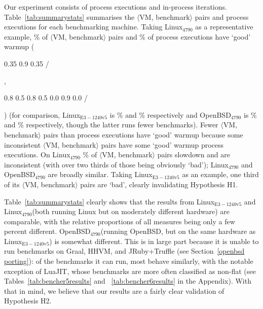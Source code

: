 \documentclass[acmlarge]{acmart}\settopmatter{printfolios=true}
\newcommand{\bencherfive}{Linux$_\mathrm{4790}$\xspace}
\newcommand{\benchersix}{OpenBSD$_\mathrm{4790}$\xspace}
\newcommand{\bencherseven}{Linux$_\mathrm{E3-1240v5}$\xspace}
\newcommand{\vmbpair}{$\langle$VM, benchmark$\rangle$\xspace}
\DeclareRobustCommand{\flatc}{%
\setlength{\sparklinethickness}{0.4pt}%
\begin{sparkline}{1.5}
\spark 0.1 0.35
       0.9 0.35
       /%
\end{sparkline}\xspace%
}
\DeclareRobustCommand{\warmup}{%
\setlength{\sparklinethickness}{0.4pt}%
\begin{sparkline}{1.5}
\spark 0.1 0.8
       0.5 0.8
       0.5 0.0
       0.9 0.0
       /%
\end{sparkline}\xspace%
}
\begin{document}
Our experiment consists of \totalpexecs{} process executions and \totaliterations{} in-process
iterations. Table~\ref{tab:summarystats} summarises the \vmbpair pairs
and process executions for each benchmarking machine. Taking \bencherfive
as a representative example,
%
\result\% of \vmbpair pairs and
%
\result\% of process executions have `good' warmup (\flatc, \warmup) (for comparison, \bencherseven
is
%
\result\% and
%
\result\% respectively and \benchersix is
%
\result\% and
%
\result\% respectively, though the latter runs fewer benchmarks).
Fewer \vmbpair pairs than process executions have `good'
warmup because some inconsistent \vmbpair pairs have some `good' warmup
process executions. On \bencherfive
\bencherfivevmbenchpairsslowdownpercentage\% of \vmbpair pairs slowdown
and  are inconsistent
(with over two thirds of those being obviously `bad'); \bencherfive and
\benchersix are broadly similar. Taking \bencherseven as an example,
one third of its \vmbpair pairs are `bad', clearly invalidating
Hypothesis H1.

Table~\ref{tab:summarystats} clearly shows that the results from \bencherseven
and \bencherfive (both running Linux but on moderately different hardware) are
comparable, with the relative proportions of all measures being only a few
percent different. \benchersix (running OpenBSD, but on the same hardware as
\bencherseven) is somewhat different. This is in large part because it
is unable to run benchmarks on Graal, HHVM, and JRuby+Truffle (see
Section~\ref{openbsd porting}): of the benchmarks it can run, most behave
similarly, with the notable exception of LuaJIT, whose benchmarks are more often
classified as non-flat (see Tables~\ref{tab:bencher5results} and ~\ref{tab:bencher6results} in the Appendix).
With that in mind, we believe that our results are a fairly clear validation of
Hypothesis H2.
\end{document}
